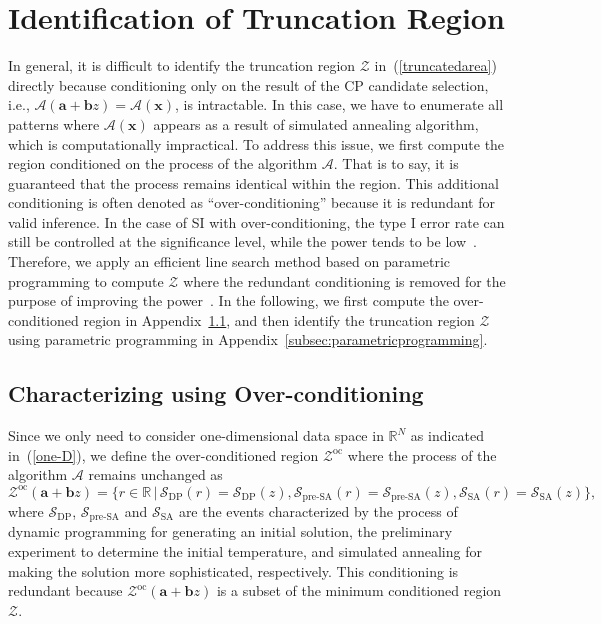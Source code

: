 \section{Identification of Truncation Region}
\label{app:truncation}
In general, it is difficult to identify the truncation region $\mathcal{Z}$ in~(\ref{truncatedarea}) directly 
because conditioning only on the result of the CP candidate selection, i.e., $\mathcal{A}(\bm{a} + \bm{b}z) = \mathcal{A}(\bm{x})$, is intractable.
In this case, we have to enumerate all patterns where $\mathcal{A}(\bm{x})$ appears as a result of simulated annealing algorithm, 
which is computationally impractical.
To address this issue, we first compute the region conditioned on the process of the algorithm $\mathcal{A}$. %
That is to say, it is guaranteed that the process remains identical within the region. 
This additional conditioning is often denoted as ``over-conditioning'' 
because it is redundant for valid inference. 
In the case of SI with over-conditioning, 
the type I error rate can still be controlled at the significance level, 
while the power tends to be low~\citep{lee2016exact, liu2018more, le2022more}. 
Therefore, we apply an efficient line search method based on parametric programming to compute $\mathcal{Z}$ where the redundant conditioning is removed for the purpose of improving the power~\citep{le2022more}.
In the following, we first compute the over-conditioned region in Appendix~\ref{subsec:over-conditioning}, 
and then identify the truncation region $\mathcal{Z}$ using parametric programming in Appendix~\ref{subsec:parametricprogramming}.

\subsection{Characterizing using Over-conditioning}
\label{subsec:over-conditioning}
Since we only need to consider one-dimensional data space in $\mathbb{R}^N$ as indicated in~(\ref{one-D}), 
we define the over-conditioned region $\mathcal{Z}^{\text{oc}}$ where the process of the algorithm $\mathcal{A}$ remains unchanged as
\begin{equation}
  \mathcal{Z}^{\text{oc}} (\bm{a} + \bm{b}z) = \{r \in \mathbb{R} \, | \, \mathcal{S}_{\text{DP}}(r) = \mathcal{S}_{\text{DP}}(z), \mathcal{S}_{\text{pre-SA}}(r) = \mathcal{S}_{\text{pre-SA}}(z), \mathcal{S}_{\text{SA}}(r) = \mathcal{S}_{\text{SA}}(z) \}, \label{oc_interval}
\end{equation}
where $\mathcal{S}_{\text{DP}}$, $\mathcal{S}_{\text{pre-SA}}$ and $\mathcal{S}_{\text{SA}}$ are the events characterized by the process of dynamic programming for generating an initial solution, 
the preliminary experiment to determine the initial temperature, 
and simulated annealing for making the solution more sophisticated, respectively. 
This conditioning is redundant because $\mathcal{Z}^{\text{oc}} (\bm{a} + \bm{b}z)$ is a subset of the minimum conditioned region $\mathcal{Z}$. 

